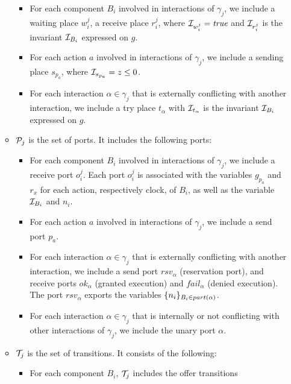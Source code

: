 \begin{definition}[Scheduler]
\begin{itemize}
\begin{itemize}
        \begin{itemize}
          \item For each component $B_i$ involved in interactions of $\gamma_j$, we include
            a waiting place $w_i^j$, a receive place $r_i^j$, where $\mathcal{I}_{w_i^j}=\textnormal{\textit{true}}$
            and $\mathcal{I}_{r_i^j}$ is the invariant $\mathcal{I}_{B_i}$ expressed on $g$.
          \item For each action $a$ involved in interactions of $\gamma_j$, we include a sending
            place $s_{p_a}$, where $\mathcal{I}_{s_{p_a}}=z\le0$.
          \item For each interaction $\alpha\in\gamma_j$ that is externally conflicting 
            with another interaction, we include a try place $t_{\alpha}$ with 
            $\mathcal{I}_{t_{\alpha}}$ is the invariant $\mathcal{I}_{B_i}$ expressed on $g$.
        \end{itemize}
        \item $\mathcal{P}_j$ is the set of ports. It includes the following ports:
          \begin{itemize}
            \item For each component $B_i$ involved in interactions of $\gamma_j$, we include
              a receive port $o_i^j$. Each port $o_i^j$ is associated with the variables
              $g_{p_a}$ and $r_x$ for each action, respectively clock, of $B_i$, as well
              as the variable $\mathcal{I}_{B_i}$ and $n_i$.
            \item For each action $a$ involved in interactions of $\gamma_j$, we include 
              a send port $p_a$.
            \item For each interaction $\alpha\in\gamma_j$ that is externally conflicting with
              another interaction, we include a send port $rsv_{\alpha}$ (reservation port), 
              and receive ports $ok_{\alpha}$ (granted execution) and $fail_{\alpha}$ (denied 
              execution). The port $rsv_{\alpha}$ exports the variables $\{n_i\}_{B_i
              \in part(\alpha)}$.
            \item For each interaction $\alpha\in\gamma_j$ that is internally or not conflicting
              with other interactions of $\gamma_j$, we include the unary port $\alpha$.
          \end{itemize}
        \item $\mathcal{T}_j$ is the set of transitions. It consists of the following:
          \begin{itemize}
            \item For each component $B_i$, $\mathcal{T}_j$ includes the offer transitions 

\end{itemize}
\end{itemize}
\end{itemize}
\end{definition}

